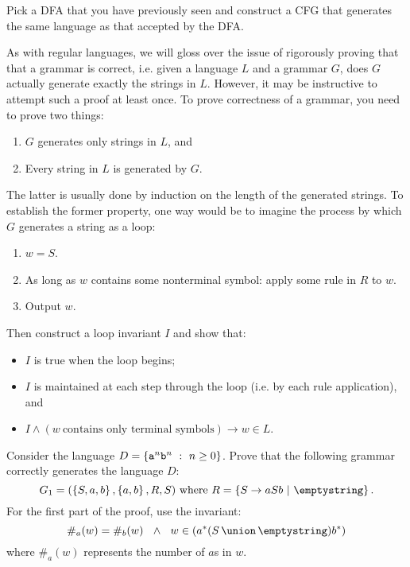 \documentclass[twoside,letterpaper,openany]{book}
\begin{document}
\begin{exer}
Pick a DFA that you have previously seen and construct a CFG that generates the same language as that accepted by the DFA.
\end{exer}

\begin{discussion}
As with regular languages, we will gloss over the issue of rigorously proving that that a grammar is correct, i.e. given a language $L$ and a grammar $G$, does $G$ actually generate exactly the strings in $L$. However, it may be instructive to attempt such a proof at least once. To prove correctness of a grammar, you need to prove two things:
\begin{enumerate}
\item $G$ generates only strings in $L$, and
\item Every string in $L$ is generated by $G$.
\end{enumerate}
The latter is usually done by induction on the length of the generated strings.
To establish the former property, one way would be to imagine the process by which $G$ generates a string as a loop:
\begin{enumerate}
\item $w = S$.
\item As long as $w$ contains some nonterminal symbol: apply some rule in $R$ to $w$.
\item Output $w$.
\end{enumerate}
Then construct a loop invariant $I$ and show that:
\begin{itemize}
\item $I$ is true when the loop begins;
\item $I$ is maintained at each step through the loop (i.e. by each rule application), and
\item $I \wedge (w~\textrm{contains only terminal symbols}) \rightarrow w \in L$.
\end{itemize}
\end{discussion}

\begin{thm}[OPTIONAL]
Consider the language $D = \left\lbrace {\texttt{a}}^n {\texttt{b}}^n\ :\ n \geq 0 \right\rbrace$. Prove that the following grammar correctly generates the language $D$: 
\[G_1 = (\setdef{S, a, b}, \setdef{a, b}, R, S) ~\textrm{where}~ R = \setdef{S \to aSb~|~\emptystring}.\]
\hint For the first part of the proof, use the invariant:
\[
 \#_a(w) = \#_b(w) ~~ \wedge ~~ w \in (\setstar{a}(\setunion{S}{\emptystring})\setstar{b})
\]
where $\#_a(w)$ represents the number of $a$s in $w$. 
\end{thm}
\end{document}
